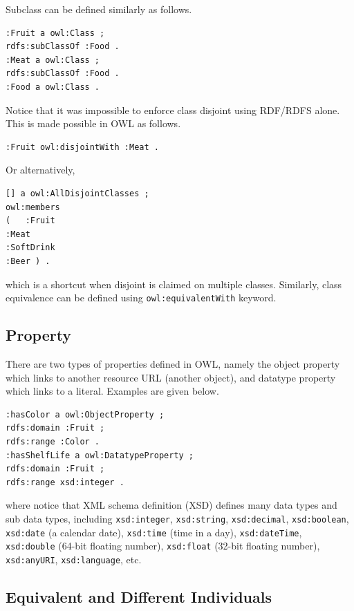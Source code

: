 Subclass can be defined similarly as follows.
\begin{lstlisting}
:Fruit a owl:Class ;
rdfs:subClassOf :Food .
:Meat a owl:Class ;
rdfs:subClassOf :Food .
:Food a owl:Class .
\end{lstlisting}

Notice that it was impossible to enforce class disjoint using RDF/RDFS alone. This is made possible in OWL as follows.
\begin{lstlisting}
:Fruit owl:disjointWith :Meat .
\end{lstlisting}
Or alternatively,
\begin{lstlisting}
[] a owl:AllDisjointClasses ;
owl:members
(	:Fruit
:Meat
:SoftDrink
:Beer ) .
\end{lstlisting}
which is a shortcut when disjoint is claimed on multiple classes. Similarly, class equivalence can be defined using \verb|owl:equivalentWith| keyword.

\subsection{Property}

There are two types of properties defined in OWL, namely the object property which links to another resource URL (another object), and datatype property which links to a literal. Examples are given below.
\begin{lstlisting}
:hasColor a owl:ObjectProperty ;
rdfs:domain :Fruit ;
rdfs:range :Color .
:hasShelfLife a owl:DatatypeProperty ;
rdfs:domain :Fruit ;
rdfs:range xsd:integer .
\end{lstlisting}
where notice that XML schema definition (XSD) defines many data types and sub data types, including \verb|xsd:integer|, \verb|xsd:string|, \verb|xsd:decimal|, \verb|xsd:boolean|, \verb|xsd:date| (a calendar date), \verb|xsd:time| (time in a day), \verb|xsd:dateTime|, \verb|xsd:double| (64-bit floating number), \verb|xsd:float| (32-bit floating number), \verb|xsd:anyURI|, \verb|xsd:language|, etc.

\subsection{Equivalent and Different Individuals}

